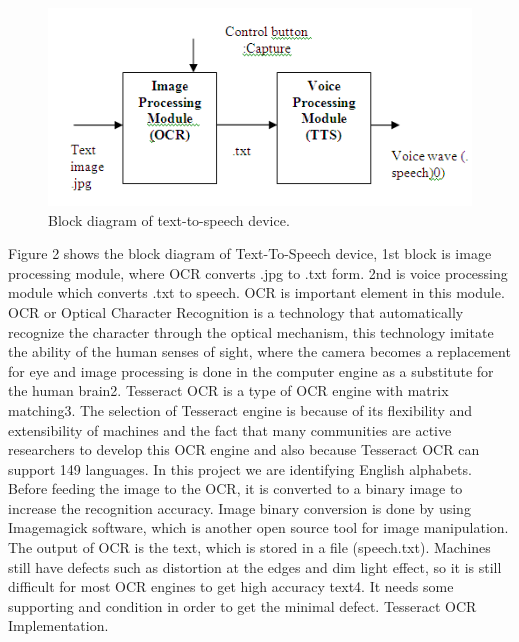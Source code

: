 \documentclass[a4paper]{article}
\begin{document}
\vspace{5mm}
\begin{figure}[h]
    \centering
    \includegraphics[scale = 1]{img2.png}
    \caption{Block diagram of text-to-speech device.}
    \label{fig:enter-label}
\end{figure}
\vspace{5mm}

\small
Figure 2 shows the block diagram of Text-To-Speech device, 1st block is image processing module, where OCR converts .jpg to .txt form. 2nd is voice processing module which converts .txt to speech. OCR is important element in this module. OCR or Optical Character Recognition is a technology that automatically recognize the character through the optical mechanism, this technology imitate the ability of the human senses of sight, where the camera becomes a replacement for eye and image processing is done in the computer engine as a substitute for the human brain2. Tesseract OCR is a type of OCR engine with matrix matching3. The selection of Tesseract engine is because of its flexibility and extensibility of machines and the fact that many communities are active researchers to develop this OCR engine and also because Tesseract OCR can support 149 languages. In this project we are identifying English alphabets. Before feeding the image to the OCR, it is converted to a binary image to increase the recognition accuracy. Image binary conversion is done by using Imagemagick software, which is another open source tool for image manipulation. The output of OCR is the text, which is stored in a file (speech.txt). Machines still have defects such as distortion at the edges and dim light effect, so it is still difficult for most OCR engines to get high accuracy text4. It needs some supporting and condition in order to get the minimal defect. Tesseract OCR Implementation.

\end{document}
